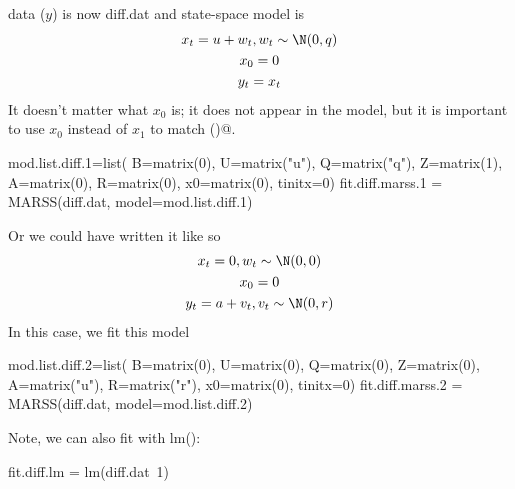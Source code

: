 \begin{wideenumerate}
data ($y$) is now diff.dat and state-space model is 
\begin{equation}
\begin{gathered}
x_t = u + w_t, w_t \sim \N(0,q) \\
x_0 = 0 \\
y_t = x_t
\end{gathered}
\end{equation}
It doesn't matter what $x_0$ is; it does not appear in the model, but it is important to use $x_0$ instead of $x_1$ to match \verb@arima()@.
\begin{Schunk}
\begin{Sinput}
 mod.list.diff.1=list(
   B=matrix(0), U=matrix("u"), Q=matrix("q"),
   Z=matrix(1), A=matrix(0), R=matrix(0),
   x0=matrix(0), tinitx=0)
 fit.diff.marss.1 = MARSS(diff.dat, model=mod.list.diff.1)
\end{Sinput}
\end{Schunk}
Or we could have written it like so
\begin{equation}
\begin{gathered}
x_t = 0, w_t \sim \N(0,0) \\
x_0 = 0 \\
y_t = a + v_t, v_t \sim \N(0,r)
\end{gathered}
\end{equation}
In this case, we fit this model
\begin{Schunk}
\begin{Sinput}
 mod.list.diff.2=list(
   B=matrix(0), U=matrix(0), Q=matrix(0),
   Z=matrix(0), A=matrix("u"), R=matrix("r"),
   x0=matrix(0), tinitx=0)
 fit.diff.marss.2 = MARSS(diff.dat, model=mod.list.diff.2)
\end{Sinput}
\end{Schunk}

Note, we can also fit with lm():
\begin{Schunk}
\begin{Sinput}
 fit.diff.lm = lm(diff.dat~1)
\end{Sinput}
\end{Schunk}


\end{wideenumerate}
